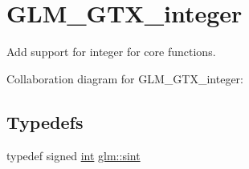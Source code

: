 \hypertarget{group__gtx__integer}{}\section{G\+L\+M\+\_\+\+G\+T\+X\+\_\+integer}
\label{group__gtx__integer}


Add support for integer for core functions.  


Collaboration diagram for G\+L\+M\+\_\+\+G\+T\+X\+\_\+integer\+:
\subsection*{Typedefs}
\begin{DoxyCompactItemize}
\item 
typedef signed \hyperlink{_s_d_l__thread_8h_a6a64f9be4433e4de6e2f2f548cf3c08e}{int} \hyperlink{group__gtx__integer_ga73643e09d8c6d362418aec541fdb987d}{glm\+::sint}
\end{DoxyCompactItemize}
